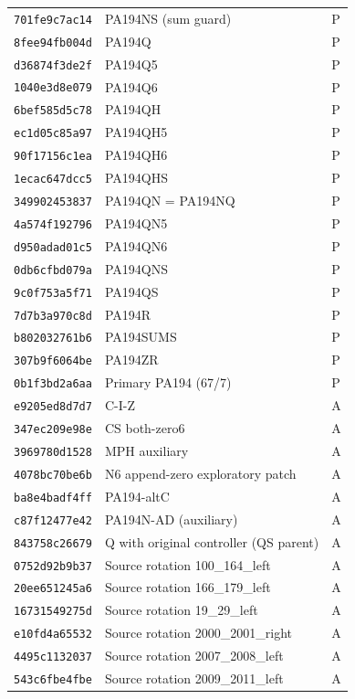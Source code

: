 \begin{longtable}{@{}p{2.3cm}p{7.8cm}p{2.25cm}@{}}
\texttt{701fe9c7ac14} & PA194NS (sum guard) & P\\
\texttt{8fee94fb004d} & PA194Q & P\\
\texttt{d36874f3de2f} & PA194Q5 & P\\
\texttt{1040e3d8e079} & PA194Q6 & P\\
\texttt{6bef585d5c78} & PA194QH & P\\
\texttt{ec1d05c85a97} & PA194QH5 & P\\
\texttt{90f17156c1ea} & PA194QH6 & P\\
\texttt{1ecac647dcc5} & PA194QHS & P\\
\texttt{349902453837} & PA194QN = PA194NQ & P\\
\texttt{4a574f192796} & PA194QN5 & P\\
\texttt{d950adad01c5} & PA194QN6 & P\\
\texttt{0db6cfbd079a} & PA194QNS & P\\
\texttt{9c0f753a5f71} & PA194QS & P\\
\texttt{7d7b3a970c8d} & PA194R & P\\
\texttt{b802032761b6} & PA194SUMS & P\\
\texttt{307b9f6064be} & PA194ZR & P\\
\texttt{0b1f3bd2a6aa} & Primary PA194 (67/7) & P\\
\texttt{e9205ed8d7d7} & C-I-Z & A\\
\texttt{347ec209e98e} & CS both-zero6 & A\\
\texttt{3969780d1528} & MPH auxiliary & A\\
\texttt{4078bc70be6b} & N6 append-zero exploratory patch & A\\
\texttt{ba8e4badf4ff} & PA194-altC & A\\
\texttt{c87f12477e42} & PA194N-AD (auxiliary) & A\\
\texttt{843758c26679} & Q with original controller (QS parent) & A\\
\texttt{0752d92b9b37} & Source rotation 100\_164\_left & A\\
\texttt{20ee651245a6} & Source rotation 166\_179\_left & A\\
\texttt{16731549275d} & Source rotation 19\_29\_left & A\\
\texttt{e10fd4a65532} & Source rotation 2000\_2001\_right & A\\
\texttt{4495c1132037} & Source rotation 2007\_2008\_left & A\\
\texttt{543c6fbe4fbe} & Source rotation 2009\_2011\_left & A\\

\end{longtable}
